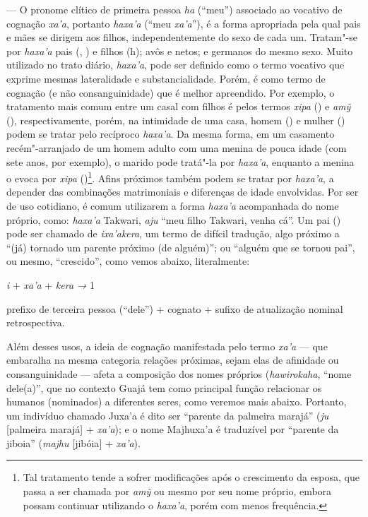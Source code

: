 \emph{} --- O pronome clítico de primeira pessoa \emph{ha}
(``meu'') associado ao vocativo de cognação \emph{xa'a}, portanto
\emph{haxa'a} (``meu \emph{xa'a}''), é a forma apropriada pela qual pais e
mães se dirigem aos filhos, independentemente do sexo de cada um.
Tratam"-se por \emph{haxa'a} pais (, ) e filhos (h); avôs e netos; e
germanos do mesmo sexo. Muito utilizado no trato diário, \emph{haxa'a},
pode ser definido como o termo vocativo que exprime mesmas lateralidade
e substancialidade. Porém, é como termo de cognação (e não
consanguinidade) que é melhor apreendido. Por exemplo, o tratamento mais
comum entre um casal com filhos é pelos termos \emph{xipa} () e
\emph{amỹ} (), respectivamente, porém, na intimidade de uma casa, homem
() e mulher () podem se tratar pelo recíproco \emph{haxa'a}. Da mesma
forma, em um casamento recém"-arranjado de um homem adulto com uma menina
de pouca idade (com sete anos, por exemplo), o marido pode tratá"-la por
\emph{haxa'a}, enquanto a menina o evoca por \emph{xipa} ()\footnote{Tal
  tratamento tende a sofrer modificações após o crescimento da esposa,
  que passa a ser chamada por \emph{amỹ} ou mesmo por seu nome próprio,
  embora possam continuar utilizando o \emph{haxa'a}, porém com menos
  frequência.}. Afins próximos também podem se tratar por \emph{haxa'a},
a depender das combinações matrimoniais e diferenças de idade
envolvidas. Por ser de uso cotidiano, é comum utilizarem a forma
\emph{haxa'a} acompanhada do nome próprio, como: \emph{haxa'a} Takwari,
\emph{aju} ``meu filho Takwari, venha cá''. Um pai () pode ser chamado de
\emph{ixa'akera}, um termo de difícil tradução, algo próximo a ``(já)
tornado um parente próximo (de alguém)''; ou ``alguém que se tornou pai'',
ou mesmo, ``crescido'', como vemos abaixo, literalmente:

\begin{center}
\emph{i} + \emph{xa'a} + \emph{kera} \emph{→} 1
\end{center}

\noindent prefixo de terceira pessoa (``dele'') + cognato + sufixo de atualização
nominal retrospectiva.

Além desses usos, a ideia de cognação manifestada pelo termo \emph{xa'a}
--- que embaralha na mesma categoria relações próximas, sejam elas de
afinidade ou consanguinidade --- afeta a composição dos nomes próprios
(\emph{hawirokaha}, ``nome dele(a)'', que no contexto Guajá tem como
principal função relacionar os humanos (nominados) a diferentes seres,
como veremos mais abaixo. Portanto, um indivíduo chamado Juxa'a é dito
ser ``parente da palmeira marajá'' (\emph{ju} {[}palmeira marajá{]} +
\emph{xa'a}); e o nome Majhuxa'a é traduzível por ``parente da jiboia''
(\emph{majhu} {[}jibóia{]} + \emph{xa'a}).

